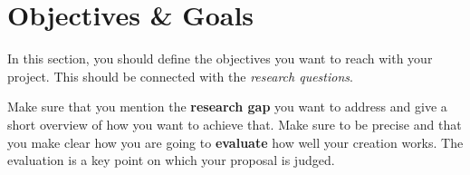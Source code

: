 \section{Objectives \& Goals}
\label{sec:objectives_and_goals}

In this section, you should define the objectives you want to reach with your project. This should be connected with the \textit{research questions}.

Make sure that you mention the \textbf{research gap} you want to address and give a short overview of how you want to achieve that. Make sure to be precise and that you make clear how you are going to \textbf{evaluate} how well your creation works. The evaluation is a key point on which your proposal is judged. 